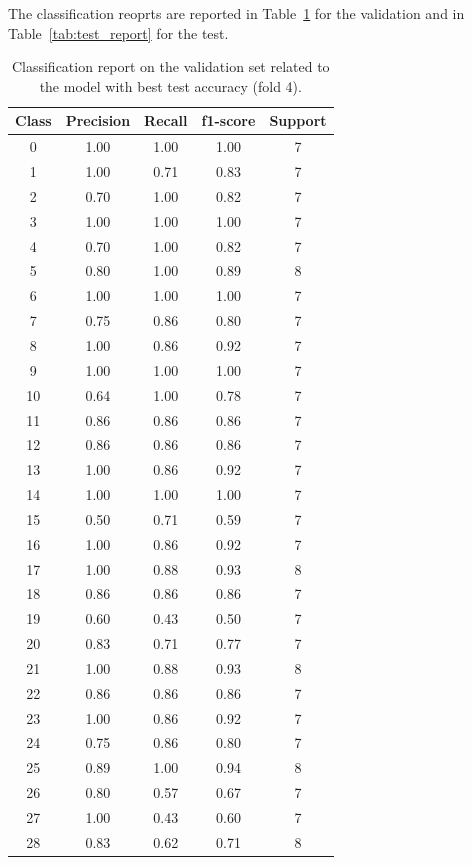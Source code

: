 \documentclass{article}
\begin{document}
\begin{sloppy}
The classification reoprts are reported in Table~\ref{tab:validation_report}
for the validation and in Table~\ref{tab:test_report} for the test.
\begin{table}[ht]
  \centering
  \caption{Classification report on the validation set related to the model with best test accuracy (fold 4).}
  \label{tab:validation_report}
\begin{tabular}{|c|c|c|c|c|}
  \hline
  Class & Precision & Recall & f1-score & Support \\
  \hline
  0  & 1.00 & 1.00 & 1.00 & 7 \\
  1  & 1.00 & 0.71 & 0.83 & 7 \\
  2  & 0.70 & 1.00 & 0.82 & 7 \\
  3  & 1.00 & 1.00 & 1.00 & 7 \\
  4  & 0.70 & 1.00 & 0.82 & 7 \\
  5  & 0.80 & 1.00 & 0.89 & 8 \\
  6  & 1.00 & 1.00 & 1.00 & 7 \\
  7  & 0.75 & 0.86 & 0.80 & 7 \\
  8  & 1.00 & 0.86 & 0.92 & 7 \\
  9  & 1.00 & 1.00 & 1.00 & 7 \\
  10 & 0.64 & 1.00 & 0.78 & 7 \\
  11 & 0.86 & 0.86 & 0.86 & 7 \\
  12 & 0.86 & 0.86 & 0.86 & 7 \\
  13 & 1.00 & 0.86 & 0.92 & 7 \\
  14 & 1.00 & 1.00 & 1.00 & 7 \\
  15 & 0.50 & 0.71 & 0.59 & 7 \\
  16 & 1.00 & 0.86 & 0.92 & 7 \\
  17 & 1.00 & 0.88 & 0.93 & 8 \\
  18 & 0.86 & 0.86 & 0.86 & 7 \\
  19 & 0.60 & 0.43 & 0.50 & 7 \\
  20 & 0.83 & 0.71 & 0.77 & 7 \\
  21 & 1.00 & 0.88 & 0.93 & 8 \\
  22 & 0.86 & 0.86 & 0.86 & 7 \\
  23 & 1.00 & 0.86 & 0.92 & 7 \\
  24 & 0.75 & 0.86 & 0.80 & 7 \\
  25 & 0.89 & 1.00 & 0.94 & 8 \\
  26 & 0.80 & 0.57 & 0.67 & 7 \\
  27 & 1.00 & 0.43 & 0.60 & 7 \\
  28 & 0.83 & 0.62 & 0.71 & 8 \\

\end{tabular}
\end{table}
\end{sloppy}
\end{document}
